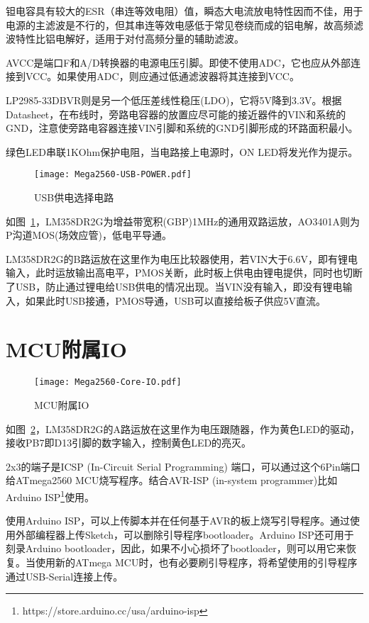 钽电容具有较大的ESR（串连等效电阻）值，瞬态大电流放电特性因而不佳，用于电源的主滤波是不行的，但其串连等效电感低于常见卷绕而成的铝电解，故高频滤波特性比铝电解好，适用于对付高频分量的辅助滤波。

AVCC是端口F和A/D转换器的电源电压引脚。即使不使用ADC，它也应从外部连接到VCC。如果使用ADC，则应通过低通滤波器将其连接到VCC。

LP2985-33DBVR则是另一个低压差线性稳压(LDO)，它将5V降到3.3V。根据Datasheet，在布线时，旁路电容器的放置应尽可能的接近器件的VIN和系统的GND，注意使旁路电容器连接VIN引脚和系统的GND引脚形成的环路面积最小。

绿色LED串联1KOhm保护电阻，当电路接上电源时，ON LED将发光作为提示。

\begin{figure}[htbp]
    \centering
    \texttt{[image: Mega2560-USB-POWER.pdf]}
    \caption{USB供电选择电路}
    \label{fig:Mega2560-USB-POWER}
\end{figure}

如图~\ref{fig:Mega2560-USB-POWER}，LM358DR2G为增益带宽积(GBP)1MHz的通用双路运放，AO3401A则为P沟道MOS(场效应管)，低电平导通。

LM358DR2G的B路运放在这里作为电压比较器使用，若VIN大于6.6V，即有锂电输入，此时运放输出高电平，PMOS关断，此时板上供电由锂电提供，同时也切断了USB，防止通过锂电给USB供电的情况出现。当VIN没有输入，即没有锂电输入，如果此时USB接通，PMOS导通，USB可以直接给板子供应5V直流。

\section{MCU附属IO}

\begin{figure}[htbp]
    \centering
    \texttt{[image: Mega2560-Core-IO.pdf]}
    \caption{MCU附属IO}
    \label{fig:Mega2560-Core-IO}
\end{figure}

如图~\ref{fig:Mega2560-Core-IO}，LM358DR2G的A路运放在这里作为电压跟随器，作为黄色LED的驱动，接收PB7即D13引脚的数字输入，控制黄色LED的亮灭。

2x3的端子是ICSP (In-Circuit Serial Programming) 端口，可以通过这个6Pin端口给ATmega2560 MCU烧写程序。结合AVR-ISP (in-system programmer)比如Arduino ISP\footnote{https://store.arduino.cc/usa/arduino-isp}使用。

使用Arduino ISP，可以上传脚本并在任何基于AVR的板上烧写引导程序。通过使用外部编程器上传Sketch，可以删除引导程序bootloader。Arduino ISP还可用于刻录Arduino bootloader，因此，如果不小心损坏了bootloader，则可以用它来恢复。当使用新的ATmega MCU时，也有必要刷引导程序，将希望使用的引导程序通过USB-Serial连接上传。

